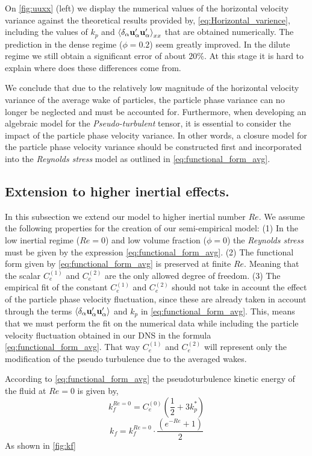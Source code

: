 On \ref{fig:uuxx} (left) we display the numerical values of the horizontal velocity variance against the theoretical results provided by, \ref{eq:Horizontal_varience}, including the values of $k_p$ and $\left<\delta_\alpha \textbf{u}_\alpha'\textbf{u}_\alpha'\right>_{xx}$ that are obtained numerically. 
The prediction in the dense regime ($\phi = 0.2$) seem greatly improved. 
In the dilute regime we still obtain a significant error of about $20\%$. 
At this stage it is hard to explain where does these differences come from. 

We conclude that due to the relatively low magnitude of the horizontal velocity variance of the average wake of particles, the particle phase variance can no longer be neglected and must be accounted for. 
Furthermore, when developing an algebraic model for the \textit{Pseudo-turbulent} tensor, it is essential to consider the impact of the particle phase velocity variance. 
In other words, a closure model for the particle phase velocity variance should be constructed first and incorporated into the \textit{Reynolds stress} model as outlined in \ref{eq:functional_form_avg}. 


\subsection{Extension to higher inertial effects. }

In this subsection we extend our model to higher inertial number $Re$. 
We assume the following properties for the creation of our semi-empirical model: 
(1) In the low inertial regime ($Re=0$) and low volume fraction ($\phi=0$) the \textit{Reynolds stress} must be given by the expression \ref{eq:functional_form_avg}. 
(2) The functional form given by \ref{eq:functional_form_avg} is preserved at finite $Re$. 
Meaning that the scalar $C_e^{(1)}$ and $C_e^{(2)}$ are the only allowed degree of freedom. 
(3) The empirical fit of the constant  $C_e^{(1)}$ and $C_e^{(2)}$ should not take in account the effect of the particle phase velocity fluctuation, since these are already taken in account through the terms $\left<\delta_\alpha \textbf{u}_\alpha'\textbf{u}_\alpha'\right>$ and $k_p$ in \ref{eq:functional_form_avg}. 
This, means that we must perform the fit on the numerical data while including the particle velocity fluctuation obtained in our DNS in the formula \eqref{eq:functional_form_avg}.
That way $C_e^{(1)}$ and $C_e^{(2)}$ will represent only the modification of the pseudo turbulence due to the averaged wakes.  

According to \ref{eq:functional_form_avg} the pseudoturbulence kinetic energy of the fluid at $Re = 0$ is given by,
\begin{equation}
    k_f^{Re = 0}
    = 
    C_e^{(0)}  \left(\frac{1}{2}  + 3 k_p^*\right)  
\end{equation}
\begin{equation}
    k_f
    = 
    k_f^{Re = 0}
    \cdot \frac{\left(e^{-Re} +1\right)}{2}
    \label{eq:semi_empirical}
\end{equation}
As shown in \ref{fig:kf}

